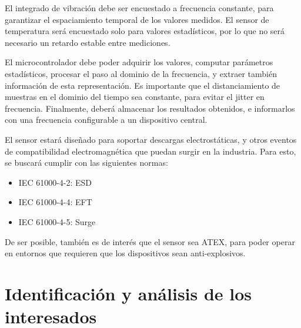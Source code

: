 \documentclass[11pt]{charter}
\begin{document}
El integrado de vibración debe ser encuestado a frecuencia constante, para garantizar el espaciamiento temporal de los valores medidos. El sensor de temperatura será encuestado solo para valores estadísticos, por lo que no será necesario un retardo estable entre mediciones.

El microcontrolador debe poder adquirir los valores, computar parámetros estadísticos, procesar el paso al dominio de la frecuencia, y extraer también información de esta representación. Es importante que el distanciamiento de muestras en el dominio del tiempo sea constante, para evitar el jitter en frecuencia. Finalmente, deberá almacenar los resultados obtenidos, e informarlos con una frecuencia configurable a un dispositivo central.

El sensor estará diseñado para soportar descargas electrostáticas, y otros eventos de compatibilidad electromagnética que puedan surgir en la industria. Para esto, se buscará cumplir con las siguientes normas:
\begin{itemize}
\item IEC 61000-4-2: ESD
\item IEC 61000-4-4: EFT
\item IEC 61000-4-5: Surge
\end{itemize}

De ser posible, también es de interés que el sensor sea ATEX, para poder operar en entornos que requieren que los dispositivos sean anti-explosivos.


\section{Identificación y análisis de los interesados}
\label{sec:interesados}
\end{document}
